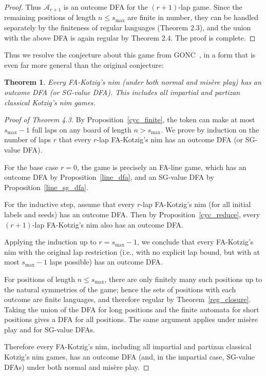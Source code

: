 \documentclass[11pt]{article}
\newtheorem{theorem}{Theorem}[section]
\theoremstyle{definition}
\theoremstyle{plain}
\begin{document}
\begin{proof}
Thus $\mathcal{A}_{r+1}$ is an outcome DFA for the $(r+1)$-lap game.
Since the remaining positions of length $n \le s_{\max}$ are finite in number, they can be handled separately by the finiteness of regular languages (Theorem 2.3), and the union with the above DFA is again regular by Theorem 2.4. The proof is complete.
\end{proof}

Thus we resolve the conjecture about this game from GONC~\cite{GONC}, in a form that is even far more general than the original conjecture:

\begin{theorem}
    Every FA-Kotzig's nim (under both normal and misère play) has an outcome DFA (or SG-value DFA).
    This includes all impartial and partizan classical Kotzig's nim games.
\end{theorem}


\begin{proof}[Proof of Theorem 4.3]
By Proposition~\ref{cyc_finite}, the token can make at most $s_{\max}-1$ full laps on any board of length $n > s_{\max}$.
We prove by induction on the number of laps $r$ that every $r$-lap FA-Kotzig's nim has an outcome DFA (or SG-value DFA).

For the base case $r = 0$, the game is precisely an FA-line game, which has an outcome DFA by Proposition~\ref{line_dfa}, and an SG-value DFA by Proposition~\ref{line_sg_dfa}.

For the inductive step, assume that every $r$-lap FA-Kotzig's nim (for all initial labels and seeds) has an outcome DFA.
Then by Proposition~\ref{cyc_reduce}, every $(r+1)$-lap FA-Kotzig's nim also has an outcome DFA.

Applying the induction up to $r = s_{\max}-1$, we conclude that every FA-Kotzig's nim with the original lap restriction (i.e., with no explicit lap bound, but with at most $s_{\max}-1$ laps possible) has an outcome DFA.

For positions of length $n \le s_{\max}$, there are only finitely many such positions up to the natural symmetries of the game; hence the sets of positions with each outcome are finite languages, and therefore regular by Theorem~\ref{reg_closure}.
Taking the union of the DFA for long positions and the finite automata for short positions gives a DFA for all positions.
The same argument applies under mis\`ere play and for SG-value DFAs.

Therefore every FA-Kotzig's nim, including all impartial and partizan classical Kotzig's nim games, has an outcome DFA (and, in the impartial case, SG-value DFAs) under both normal and mis\`ere play.
\end{proof}
\end{document}
